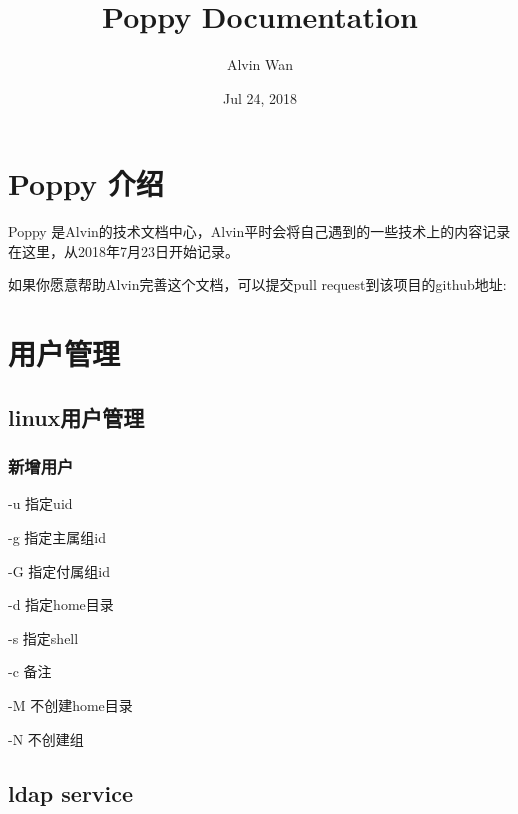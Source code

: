 \documentclass[letterpaper,10pt,english]{sphinxmanual}
\title{Poppy Documentation}
\date{Jul 24, 2018}
\author{Alvin Wan}
\begin{document}
\maketitle
\sphinxtableofcontents
{}\label{\detokenize{index::doc}}



\chapter{Poppy 介绍}
\label{\detokenize{introduction:poppy}}\label{\detokenize{introduction::doc}}
Poppy 是Alvin的技术文档中心，Alvin平时会将自己遇到的一些技术上的内容记录在这里，从2018年7月23日开始记录。

如果你愿意帮助Alvin完善这个文档，可以提交pull request到该项目的github地址:

\noindent{}


\chapter{用户管理}
\label{\detokenize{user_management/readme:id1}}\label{\detokenize{user_management/readme::doc}}

\section{linux用户管理}
\label{\detokenize{user_management/user:linux}}\label{\detokenize{user_management/user::doc}}

\subsection{新增用户}
\label{\detokenize{user_management/user:id1}}
%
\begin{sphinxVerbatim}[commandchars=\\\{\}]
 
\end{sphinxVerbatim}

-u 指定uid

-g 指定主属组id

-G 指定付属组id

-d 指定home目录

-s 指定shell

-c 备注

-M 不创建home目录

-N 不创建组


\section{ldap service}
\label{\detokenize{user_management/ldap:ldap-service}}\label{\detokenize{user_management/ldap::doc}}
\end{document}
